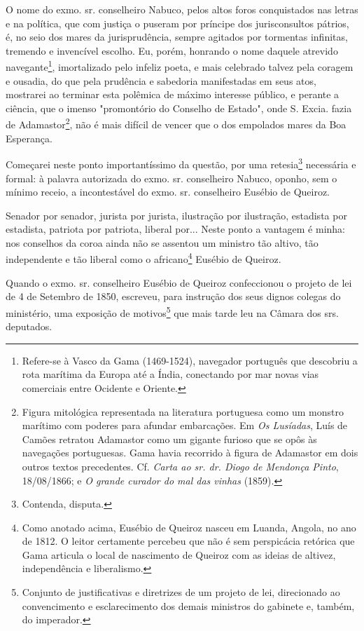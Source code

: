 O nome do exmo. sr. conselheiro Nabuco, pelos altos foros conquistados
nas letras e na política, que com justiça o puseram por príncipe dos
jurisconsultos pátrios, é, no seio dos mares da jurisprudência, sempre
agitados por tormentas infinitas, tremendo e invencível escolho. Eu,
porém, honrando o nome daquele atrevido navegante\footnote{Refere-se à
  Vasco da Gama (1469-1524), navegador português que descobriu a rota
  marítima da Europa até a Índia, conectando por mar novas vias
  comerciais entre Ocidente e Oriente.}, imortalizado pelo infeliz
poeta, e mais celebrado talvez pela coragem e ousadia, do que pela
prudência e sabedoria manifestadas em seus atos, mostrarei ao terminar
esta polêmica de máximo interesse público, e perante a ciência, que o
imenso "promontório do Conselho de Estado", onde S. Excia. fazia de
Adamastor\footnote{Figura mitológica representada na literatura
  portuguesa como um monstro marítimo com poderes para afundar
  embarcações. Em \emph{Os Lusíadas}, Luís de Camões retratou Adamastor
  como um gigante furioso que se opôs às navegações portuguesas. Gama
  havia recorrido à figura de Adamastor em dois outros textos
  precedentes. Cf. \emph{Carta ao sr. dr. Diogo de Mendonça Pinto},
  18/08/1866; e \emph{O grande curador do mal das vinhas} (1859).}, não
é mais difícil de vencer que o dos empolados mares da Boa Esperança.

Começarei neste ponto importantíssimo da questão, por uma
retesia\footnote{Contenda, disputa.} necessária e formal: à palavra
autorizada do exmo. sr. conselheiro Nabuco, oponho, sem o mínimo receio,
a incontestável do exmo. sr. conselheiro Eusébio de Queiroz.

Senador por senador, jurista por jurista, ilustração por ilustração,
estadista por estadista, patriota por patriota, liberal por... Neste
ponto a vantagem é minha: nos conselhos da coroa ainda não se assentou
um ministro tão altivo, tão independente e tão liberal como o
africano\footnote{Como anotado acima, Eusébio de Queiroz nasceu em
  Luanda, Angola, no ano de 1812. O leitor certamente percebeu que não é
  sem perspicácia retórica que Gama articula o local de nascimento de
  Queiroz com as ideias de altivez, independência e liberalismo.}
Eusébio de Queiroz.

Quando o exmo. sr. conselheiro Eusébio de Queiroz confeccionou o projeto
de lei de 4 de Setembro de 1850, escreveu, para instrução dos seus
dignos colegas do ministério, uma exposição de motivos\footnote{
  Conjunto de justificativas e diretrizes de um projeto de lei,
  direcionado ao convencimento e esclarecimento dos demais ministros do
  gabinete e, também, do imperador.} que mais tarde leu na Câmara dos
srs. deputados.

